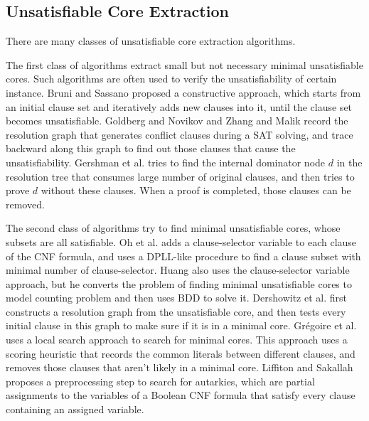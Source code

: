 \documentclass[journal]{IEEEtran}
\begin{document}
\subsection{Unsatisfiable Core Extraction}\label{subsec_UNS}


There are many classes of unsatisfiable core extraction algorithms.


The first class of algorithms extract small but not necessary minimal unsatisfiable cores.
Such algorithms are often used to verify the unsatisfiability of certain instance.
Bruni and Sassano\cite{RestoreSat} proposed a constructive approach,
which starts from an initial clause set and iteratively adds new clauses into it,
until the clause set becomes unsatisfiable.
Goldberg and Novikov\cite{VERPROOF} and Zhang and Malik\cite{VALIDSAT} record the resolution graph that generates conflict clauses during a SAT solving,
and trace backward along this graph to find out those clauses that cause the unsatisfiability.
Gershman et al. \cite{DOMINSTOR} tries to find the internal dominator node $d$ in the resolution tree that consumes large number of original clauses, and then tries to prove $d$ without these clauses. When a proof is completed, those clauses can be removed.


The second class of algorithms try to find minimal unsatisfiable cores, whose subsets are all satisfiable.
Oh et al. \cite{AMUSE} adds a clause-selector variable to each clause of the CNF formula, and uses a DPLL-like procedure to find a clause subset with minimal number of clause-selector.
Huang \cite{MUP} also uses the clause-selector variable approach,
but he converts the problem of finding minimal unsatisfiable cores to model counting problem and then uses BDD to solve it.
Dershowitz et al. \cite{ScalableMU} first constructs a resolution graph from the unsatisfiable core,
and then tests every initial clause in this graph to make sure if it is in a minimal core.
Gr\'egoire et al. \cite{LocalMU} uses a local search approach to search for minimal cores.
This approach uses a scoring heuristic that records the common literals between different clauses,
and removes those clauses that aren't likely in a minimal core.
Liffiton and Sakallah\cite{Trim} proposes a preprocessing step to search for
autarkies, which are partial assignments to the variables of a Boolean
CNF formula that satisfy every clause containing an assigned variable.
\end{document}
